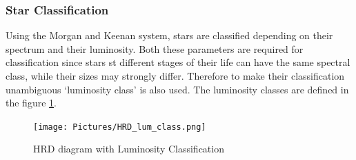 \documentclass[12pt,a4paper]{article}
\begin{document}
    \subsubsection{Star Classification}
    Using the Morgan and Keenan system, stars are classified depending on their spectrum and their luminosity. Both these parameters are required for classification since 
    stars st different stages of their life can have the same spectral class, while their sizes may strongly differ. Therefore to make their classification unambiguous `luminosity class' 
    is also used. The luminosity classes are defined in the figure \ref{fig:MK}.
    \begin{figure}[H]
      \centering
      \texttt{[image: Pictures/HRD\_lum\_class.png]}
      \caption{HRD diagram with Luminosity Classification}
      \label{fig:MK}
    \end{figure}
\end{document}
